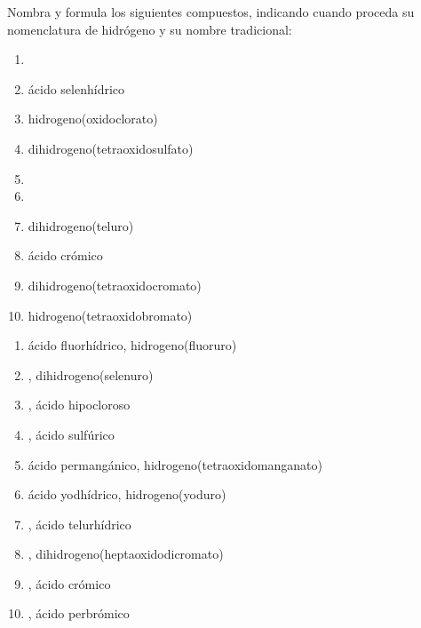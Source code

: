 \begin{exercise}[
    tags    = {inorgánica,ácidos,ácidos binarios,ácidos ternarios,oxoácidos},
    topics  = {química inorgánica,formulación,nomenclatura},
    source  = {SAN Formulación, p28, e34},
  ]
  Nombra y formula los siguientes compuestos, indicando cuando proceda su nomenclatura de hidrógeno y su nombre tradicional:

  \begin{enumerate}
    \item {}
    \item ácido selenhídrico
    \item hidrogeno(oxidoclorato)
    \item dihidrogeno(tetraoxidosulfato)
    \item {}
    \item {}
    \item dihidrogeno(teluro)
    \item ácido crómico
    \item dihidrogeno(tetraoxidocromato)
    \item hidrogeno(tetraoxidobromato)
  \end{enumerate}
\end{exercise}

\begin{solution}
  \begin{enumerate}
    \item ácido fluorhídrico, hidrogeno(fluoruro)
    \item {}, dihidrogeno(selenuro)
    \item {}, ácido hipocloroso
    \item {}, ácido sulfúrico
    \item ácido permangánico,  hidrogeno(tetraoxidomanganato)
    \item ácido yodhídrico, hidrogeno(yoduro)
    \item {}, ácido telurhídrico
    \item {}, dihidrogeno(heptaoxidodicromato)
    \item {}, ácido crómico
    \item {}, ácido perbrómico
  \end{enumerate}
\end{solution}




